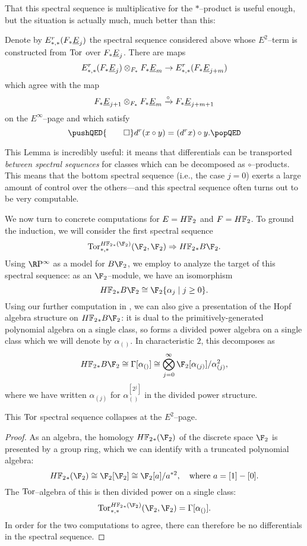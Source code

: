 That this spectral sequence is multiplicative for the \(\ast\)--product is useful enough, but the situation is actually much, much better than this:
\begin{lemma}\label{CircProductAndDifferentials}
Denote by \(E^r_{*, *}(F_* \underline{\smash{E}}_{j})\) the spectral sequence considered above whose \(E^2\)--term is constructed from \(\operatorname{Tor}\) over \(F_* \underline{\smash{E}}_{j}\).  There are maps \[E^r_{*, *}(F_* \underline{\smash{E}}_{j}) \otimes_{F_*} F_* \underline{\smash{E}}_{m} \to E^r_{*, *}(F_* \underline{\smash{E}}_{j+m})\] which agree with the map \[F_* \underline{\smash{E}}_{j+1} \otimes_{F_*} F_* \underline{\smash{E}}_{m} \xrightarrow{\circ} F_* \underline{\smash{E}}_{j+m+1}\] on the \(E^\infty\)--page and which satisfy
\[
\pushQED{\qed}
d^r(x \circ y) = (d^r x) \circ y. \qedhere
\popQED
\]
\end{lemma}
\noindent This Lemma is incredibly useful: it means that differentials can be transported \emph{between spectral sequences} for classes which can be decomposed as \(\circ\)--products.  This means that the bottom spectral sequence (i.e., the case \(j = 0\)) exerts a large amount of control over the others---and this spectral sequence often turns out to be very computable.

We now turn to concrete computations for \(E = \HFtwo\) and \(F = \HFtwo\).  To ground the induction, we will consider the first spectral sequence \[\Tor^{\HFtwo_*(\F_2)}_{*, *}(\F_2, \F_2) \Rightarrow \HFtwo_* B\F_2.\]  Using \(\RP^\infty\) as a model for \(B\F_2\), we employ  to analyze the target of this spectral sequence: as an \(\F_2\)--module, we have an isomorphism \[\HFtwo_* B\F_2 \cong \F_2\{\alpha_j \mid j \ge 0\}.\]  Using our further computation in , we can also give a presentation of the Hopf algebra structure on \(\HFtwo_* B\F_2\): it is dual to the primitively-generated polynomial algebra on a single class, so forms a divided power algebra on a single class which we will denote by \(\alpha_{()}\).  In characteristic \(2\), this decomposes as \[\HFtwo_* B\F_2 \cong \Gamma[\alpha_{()}] \cong \bigotimes_{j=0}^\infty \F_2[\alpha_{(j)}] / \alpha_{(j)}^2,\] where we have written \(\alpha_{(j)}\) for \(\alpha_{()}^{[2^j]}\) in the divided power structure.

\begin{corollary}
This \(\operatorname{Tor}\) spectral sequence collapses at the \(E^2\)--page.
\end{corollary}
\begin{proof}
As an algebra, the homology \(\HFtwo_*(\F_2)\) of the discrete space \(\F_2\) is presented by a group ring, which we can identify with a truncated polynomial algebra: \[\HFtwo_*(\F_2) \cong \F_2[\F_2] \cong  \F_2[a] / a^{\ast 2}, \quad \text{where \(a = [1] - [0]\)}.\]  The \(\operatorname{Tor}\)--algebra of this is then divided power on a single class: \[\Tor^{\HFtwo_*(\F_2)}_{*, *}(\F_2, \F_2) = \Gamma[\alpha_{()}].\]  In order for the two computations to agree, there can therefore be no differentials in the spectral sequence.
\end{proof}

